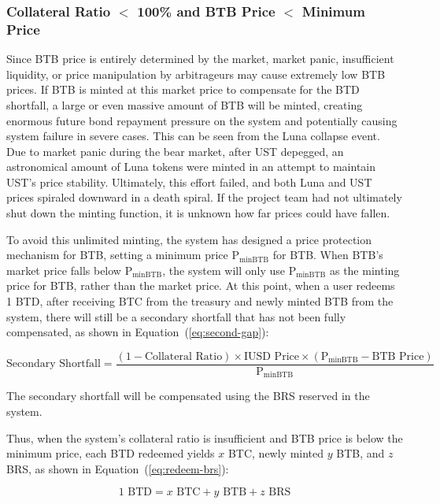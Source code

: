 \documentclass{article}
\begin{document}
\subsubsection{Collateral Ratio $<$ 100\% and BTB Price $<$ Minimum Price}

Since BTB price is entirely determined by the market, market panic, insufficient liquidity, or price manipulation by arbitrageurs may cause extremely low BTB prices. If BTB is minted at this market price to compensate for the BTD shortfall, a large or even massive amount of BTB will be minted, creating enormous future bond repayment pressure on the system and potentially causing system failure in severe cases. This can be seen from the Luna collapse event. Due to market panic during the bear market, after UST depegged, an astronomical amount of Luna tokens were minted in an attempt to maintain UST's price stability. Ultimately, this effort failed, and both Luna and UST prices spiraled downward in a death spiral. If the project team had not ultimately shut down the minting function, it is unknown how far prices could have fallen.

To avoid this unlimited minting, the system has designed a price protection mechanism for BTB, setting a minimum price $\text{P}_\text{minBTB}$ for BTB. When BTB's market price falls below $\text{P}_\text{minBTB}$, the system will only use $\text{P}_\text{minBTB}$ as the minting price for BTB, rather than the market price. At this point, when a user redeems 1 BTD, after receiving BTC from the treasury and newly minted BTB from the system, there will still be a secondary shortfall that has not been fully compensated, as shown in Equation~(\ref{eq:second-gap}):

\begin{equation}
\text{Secondary Shortfall}=\frac{ (1-\text{Collateral Ratio})\times\text{IUSD Price}\times(\text{P}_\text{minBTB}-\text{BTB Price})}{\text{P}_\text{minBTB}}
\label{eq:second-gap}
\end{equation}

The secondary shortfall will be compensated using the BRS reserved in the system.

Thus, when the system's collateral ratio is insufficient and BTB price is below the minimum price, each BTD redeemed yields $x$ BTC, newly minted $y$ BTB, and $z$ BRS, as shown in Equation~(\ref{eq:redeem-brs}):

\begin{equation}
1 \text{ BTD} = x \text{ BTC} + y \text{ BTB}+ z \text{ BRS}
\label{eq:redeem-brs}
\end{equation}
\end{document}
